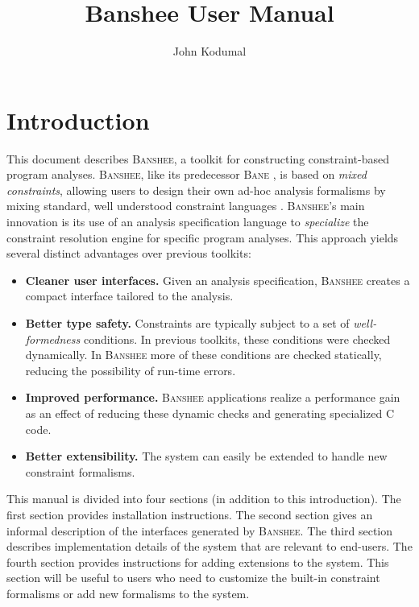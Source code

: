 \documentclass{article}
\title{Banshee User Manual}
\author{John Kodumal}
\newcommand{\bane}{\textsc{Bane}}
\newcommand{\banshee}{\textsc{Banshee}}
\begin{document}
\maketitle

\section{Introduction}

This document describes \banshee{}, a toolkit for constructing constraint-based
program analyses. \banshee{}, like its predecessor \bane{} \cite{aiken:tic98}, is based on \emph{mixed constraints}, allowing users to design their own ad-hoc analysis formalisms by mixing standard, well understood constraint languages \cite{aiken:sas97}. \banshee{}'s main innovation is its use of an analysis 
specification language to \emph{specialize} the constraint resolution engine 
for specific program analyses. This approach yields several distinct 
advantages over previous toolkits:
\begin{itemize}
\item \textbf{Cleaner user interfaces.} Given an analysis 
specification, \banshee{} creates a compact interface tailored to the analysis.
\item \textbf{Better type safety.} Constraints are typically subject to a set
of \emph{well-formedness} conditions. In previous toolkits, these conditions 
were checked dynamically. In \banshee{} more of these conditions are checked
statically, reducing the possibility of run-time errors.
\item \textbf{Improved performance.} \banshee{} applications realize a 
performance gain as an effect of reducing these dynamic checks and generating
specialized C code.
\item \textbf{Better extensibility.} The system can easily be extended to handle new constraint formalisms.
\end{itemize}

This manual is divided into four sections (in addition to this introduction). 
The first section provides installation instructions. The second section gives an informal description of the interfaces generated 
by \banshee{}.
The third section describes implementation details of the system that are 
relevant to end-users. The fourth section provides instructions for adding 
extensions to the system. This section will be useful to users who 
need to customize the built-in constraint formalisms or add new formalisms to
the system.
\end{document}
